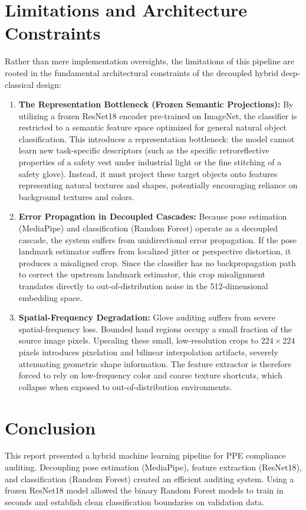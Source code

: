 \documentclass[11pt,a4paper]{article}
\begin{document}
\section{Limitations and Architecture Constraints}
Rather than mere implementation oversights, the limitations of this pipeline are rooted in the fundamental architectural constraints of the decoupled hybrid deep-classical design:
\begin{enumerate}
\item \textbf{The Representation Bottleneck (Frozen Semantic Projections):} By utilizing a frozen ResNet18 encoder pre-trained on ImageNet, the classifier is restricted to a semantic feature space optimized for general natural object classification. This introduces a representation bottleneck: the model cannot learn new task-specific descriptors (such as the specific retroreflective properties of a safety vest under industrial light or the fine stitching of a safety glove). Instead, it must project these target objects onto features representing natural textures and shapes, potentially encouraging reliance on background textures and colors.
\item \textbf{Error Propagation in Decoupled Cascades:} Because pose estimation (MediaPipe) and classification (Random Forest) operate as a decoupled cascade, the system suffers from unidirectional error propagation. If the pose landmark estimator suffers from localized jitter or perspective distortion, it produces a misaligned crop. Since the classifier has no backpropagation path to correct the upstream landmark estimator, this crop misalignment translates directly to out-of-distribution noise in the 512-dimensional embedding space.
\item \textbf{Spatial-Frequency Degradation:} Glove auditing suffers from severe spatial-frequency loss. Bounded hand regions occupy a small fraction of the source image pixels. Upscaling these small, low-resolution crops to $224 \times 224$ pixels introduces pixelation and bilinear interpolation artifacts, severely attenuating geometric shape information. The feature extractor is therefore forced to rely on low-frequency color and coarse texture shortcuts, which collapse when exposed to out-of-distribution environments.
\end{enumerate}
\section{Conclusion}
This report presented a hybrid machine learning pipeline for PPE compliance auditing. Decoupling pose estimation (MediaPipe), feature extraction (ResNet18), and classification (Random Forest) created an efficient auditing system. Using a frozen ResNet18 model allowed the binary Random Forest models to train in seconds and establish clean classification boundaries on validation data.
\end{document}
